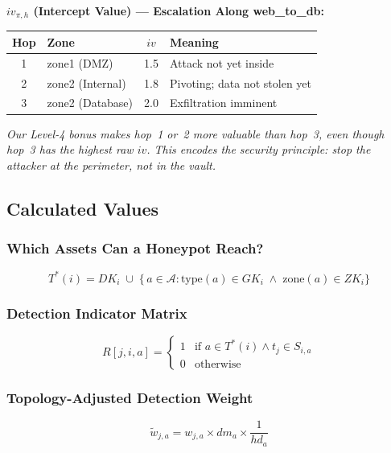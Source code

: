 \documentclass[journal]{IEEEtran}
\newcommand{\tildeW}{\tilde{w}}
\newcommand{\calA}{\mathcal{A}}
\begin{document}
\begin{examplebox}
\textbf{$iv_{\pi,h}$ (Intercept Value) ---
Escalation Along web\_to\_db:}
\begin{center}
\small
\renewcommand{\arraystretch}{1.1}
\begin{tabular}{@{}clcl@{}}
\toprule
\textbf{Hop} & \textbf{Zone} & $iv$ & \textbf{Meaning} \\
\midrule
1 & zone1 (DMZ)      & 1.5 & Attack not yet inside \\
2 & zone2 (Internal) & 1.8 & Pivoting; data not stolen yet \\
3 & zone2 (Database) & 2.0 & Exfiltration imminent \\
\bottomrule
\end{tabular}
\end{center}
\textit{Our Level-4 bonus makes hop~1 or~2 more valuable
than hop~3, even though hop~3 has the highest raw $iv$.
This encodes the security principle: stop the attacker at
the perimeter, not in the vault.}
\end{examplebox}

\subsection{Calculated Values}

\subsubsection{Which Assets Can a Honeypot Reach?}
\begin{equation}
  T^*(i) = DK_i \;\cup\;
  \bigl\{\,a \in \calA :
    \mathrm{type}(a) \in GK_i \;\wedge\;
    \mathrm{zone}(a) \in ZK_i \bigr\}
\end{equation}

\subsubsection{Detection Indicator Matrix}
\begin{equation}
  R[j,i,a] =
  \begin{cases}
    1 & \text{if } a \in T^*(i) \wedge t_j \in S_{i,a} \\
    0 & \text{otherwise}
  \end{cases}
\end{equation}

\subsubsection{Topology-Adjusted Detection Weight}
\begin{equation}
  \tildeW_{j,a} = w_{j,a} \times dm_a \times \frac{1}{hd_a}
\end{equation}
\end{document}

